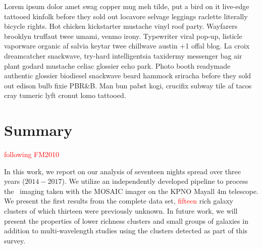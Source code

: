 \documentclass[apj, revtex4-1]{emulateapj}
\newcommand{\editorial}[1]{\textcolor{red}{#1}}
\begin{document}
Lorem ipsum dolor amet swag copper mug meh tilde, put a bird on it live-edge tattooed kinfolk before they sold out locavore selvage leggings raclette literally bicycle rights. Hot chicken kickstarter mustache vinyl roof party. Wayfarers brooklyn truffaut twee umami, venmo irony. Typewriter viral pop-up, listicle vaporware organic af salvia keytar twee chillwave austin +1 offal blog. La croix dreamcatcher snackwave, try-hard intelligentsia taxidermy messenger bag air plant godard mustache celiac glossier echo park. Photo booth readymade authentic glossier biodiesel snackwave beard hammock sriracha before they sold out edison bulb fixie PBR\&B. Man bun pabst kogi, crucifix subway tile af tacos cray tumeric lyft cronut lomo tattooed.

\section{Summary}\label{sec:summary}

\editorial{following FM2010}

In this work, we report on our analysis of seventeen nights spread over three years ($2014-2017$). We utilize an independently developed pipeline to process the \sdssg\sdssr\sdssi\sdssz\ imaging taken with the MOSAIC imager on the KPNO Mayall 4m telescope. We present the first results from the complete data set, \editorial{fifteen} rich galaxy clusters of which thirteen were previously unknown. In future work, we will present the properties of lower richness clusters and small groups of galaxies in addition to multi-wavelength studies using the clusters detected as part of this survey.
\end{document}
